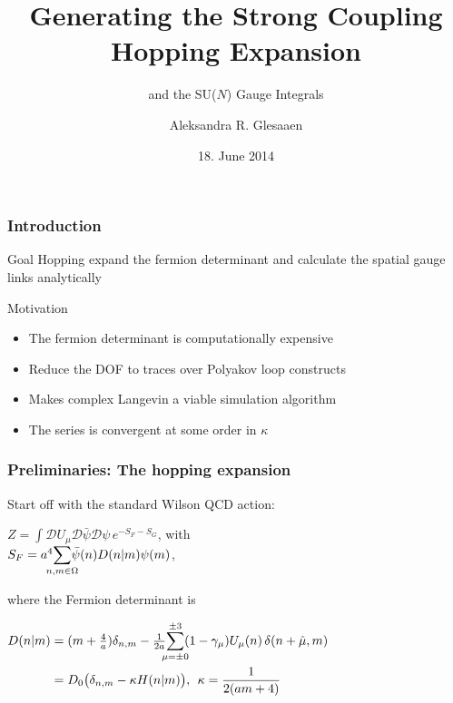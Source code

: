 \documentclass[10pt,a4paper,usenames,dvipsnames]{beamer}
\title[Hopping Expansion]{\Large Generating the Strong Coupling Hopping Expansion}
\subtitle{and the SU($N$) Gauge Integrals}
\author{Aleksandra R. Glesaaen}
\institute[Goethe-Uni]{Goethe-Universit\"{a}t Frankfurt am Main}
\date{18. June 2014}
\begin{document}
{
  \begin{frame}
    \titlepage
  \end{frame}
}

\begin{frame}
  \frametitle{Introduction}

  \begin{alertblock}{Goal}
    Hopping expand the fermion determinant and calculate the spatial gauge links analytically
  \end{alertblock}

  \vfill

  \begin{block}{Motivation}
    \begin{itemize} \color{black} 
      \item The fermion determinant is computationally expensive
      \item Reduce the DOF to traces over Polyakov loop constructs
      \item Makes complex Langevin a viable simulation algorithm
      \item The series is convergent at some order in $\kappa$
    \end{itemize}
  \end{block}

\end{frame}

\begin{frame}
  \frametitle{Preliminaries: The hopping expansion}

  Start off with the standard Wilson QCD action:
  \begin{block}{}
    \centering
    $Z = {\displaystyle\int} \mathcal{D} U_{\mu} \mathcal{D} \bar{\psi} \mathcal{D} \psi \, e^{-S_F -S_G}$, with \\
    $S_F = a^4 {\displaystyle\sum_{\mathclap{n,m \in \Omega}}} \bar{\psi}(n) D(n|m) \psi(m)$,
  \end{block}
  where the Fermion determinant is
  \begin{block}{}
    \centering
    $\begin{aligned}
      D(n|m) &= (m + {\textstyle\frac{4}{a}}) \delta_{n,m} - {\textstyle\frac{1}{2a}} {\displaystyle\sum_{\mathclap{\mu = \pm 0}}^{\pm 3}} (1 - \gamma_{\mu})
      U_{\mu}(n) \, \delta(n + \hat{\mu}, m) \\
      &= D_0 \big( \delta_{n,m} - \kappa H(n|m) \big), \:\: \kappa = \frac{1}{2(am + 4)}
    \end{aligned}$
  \end{block}
\end{frame}
\end{document}
